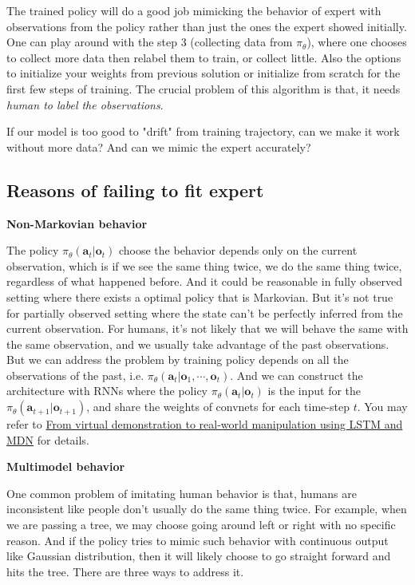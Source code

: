 \documentclass[nobib]{tufte-handout}
\begin{document}
The trained policy will do a good job mimicking the behavior of expert with observations from the policy rather than just the ones the expert showed initially. One can play around with the step 3 (collecting data from $\pi_\theta$), where one chooses to collect more data then relabel them to train, or collect little. Also the options to initialize your weights from previous solution or initialize from scratch for the first few steps of training. The crucial problem of this algorithm is that, it needs \emph{human to label the observations}.

If our model is too good to "drift" from training trajectory, can we make it work without more data? And can we mimic the expert accurately?

\subsection{Reasons of failing to fit expert}

\textbf{Non-Markovian behavior}

The policy $\pi_\theta(\mathbf{a}_t | \mathbf{o}_t)$ choose the behavior depends only on the current observation, which is if we see the same thing twice, we do the same thing twice, regardless of what happened before. And it could be reasonable in fully observed setting where there exists a optimal policy that is Markovian. But it's not true for partially observed setting where the state can't be perfectly inferred from the current observation. For humans, it's not likely that we will behave the same with the same observation, and we usually take advantage of the past observations. But we can address the problem by training policy depends on all the observations of the past, i.e. $\pi_\theta(\mathbf{a}_t | \mathbf{o}_1, \cdots, \mathbf{o}_t)$. And we can construct the architecture with RNNs where the policy $\pi_\theta(\mathbf{a}_t | \mathbf{o}_t)$ is the input for the $\pi_\theta(\mathbf{a}_{t+1} | \mathbf{o}_{t+1})$, and share the weights of convnets for each time-step $t$. You may refer to \href{https://arxiv.org/abs/1603.03833}{From virtual demonstration to real-world manipulation using LSTM and MDN} for details.

\noindent\textbf{Multimodel behavior}

One common problem of imitating human behavior is that, humans are inconsistent like people don't usually do the same thing twice. For example, when we are passing a tree, we may choose going around left or right with no specific reason. And if the policy tries to mimic such behavior with continuous output like Gaussian distribution, then it will likely choose to go straight forward and hits the tree. There are three ways to address it.
\end{document}
